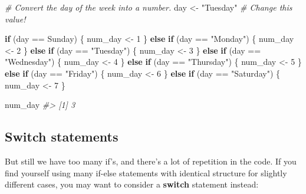 \documentclass[
]{book}
\newenvironment{Shaded}{\begin{snugshade}}{\end{snugshade}}
\newcommand{\CommentTok}[1]{\textcolor[rgb]{0.56,0.35,0.01}{\textit{#1}}}
\newcommand{\ControlFlowTok}[1]{\textcolor[rgb]{0.13,0.29,0.53}{\textbf{#1}}}
\newcommand{\DecValTok}[1]{\textcolor[rgb]{0.00,0.00,0.81}{#1}}
\newcommand{\NormalTok}[1]{#1}
\newcommand{\OtherTok}[1]{\textcolor[rgb]{0.56,0.35,0.01}{#1}}
\newcommand{\SpecialCharTok}[1]{\textcolor[rgb]{0.00,0.00,0.00}{#1}}
\newcommand{\StringTok}[1]{\textcolor[rgb]{0.31,0.60,0.02}{#1}}
\begin{document}
\begin{Shaded}
\begin{Highlighting}[]
\CommentTok{\# Convert the day of the week into a number.}
\NormalTok{day }\OtherTok{\textless{}{-}} \StringTok{"Tuesday"} \CommentTok{\# Change this value!}

\ControlFlowTok{if}\NormalTok{ (day }\SpecialCharTok{==} \StringTok{\textquotesingle{}Sunday\textquotesingle{}}\NormalTok{) \{}
\NormalTok{  num\_day }\OtherTok{\textless{}{-}} \DecValTok{1}
\NormalTok{\} }\ControlFlowTok{else} \ControlFlowTok{if}\NormalTok{ (day }\SpecialCharTok{==} \StringTok{"Monday"}\NormalTok{) \{}
\NormalTok{  num\_day }\OtherTok{\textless{}{-}} \DecValTok{2}
\NormalTok{\} }\ControlFlowTok{else} \ControlFlowTok{if}\NormalTok{ (day }\SpecialCharTok{==} \StringTok{"Tuesday"}\NormalTok{) \{}
\NormalTok{  num\_day }\OtherTok{\textless{}{-}} \DecValTok{3}
\NormalTok{\} }\ControlFlowTok{else} \ControlFlowTok{if}\NormalTok{ (day }\SpecialCharTok{==} \StringTok{"Wednesday"}\NormalTok{) \{}
\NormalTok{  num\_day }\OtherTok{\textless{}{-}} \DecValTok{4}
\NormalTok{\} }\ControlFlowTok{else} \ControlFlowTok{if}\NormalTok{ (day }\SpecialCharTok{==} \StringTok{"Thursday"}\NormalTok{) \{}
\NormalTok{  num\_day }\OtherTok{\textless{}{-}} \DecValTok{5}
\NormalTok{\} }\ControlFlowTok{else} \ControlFlowTok{if}\NormalTok{ (day }\SpecialCharTok{==} \StringTok{"Friday"}\NormalTok{) \{}
\NormalTok{  num\_day }\OtherTok{\textless{}{-}} \DecValTok{6}
\NormalTok{\} }\ControlFlowTok{else} \ControlFlowTok{if}\NormalTok{ (day }\SpecialCharTok{==} \StringTok{"Saturday"}\NormalTok{) \{}
\NormalTok{  num\_day }\OtherTok{\textless{}{-}} \DecValTok{7}
\NormalTok{\}}

\NormalTok{num\_day}
\CommentTok{\#\textgreater{} [1] 3}
\end{Highlighting}
\end{Shaded}

\hypertarget{switch-statements}{%
\subsection{Switch statements}\label{switch-statements}}

But still we have too many if's, and there's a lot of repetition in the code.
If you find yourself using many if-else statements with identical structure for
slightly different cases, you may want to consider a \textbf{switch} statement
instead:
\end{document}
